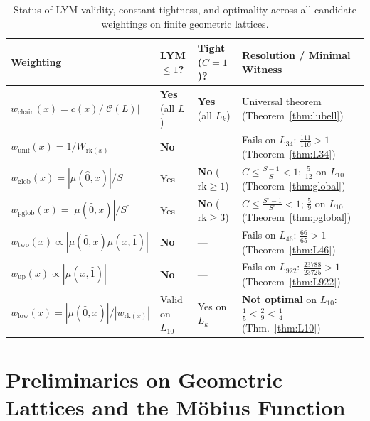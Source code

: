 \documentclass[11pt]{article}
\theoremstyle{definition}
\theoremstyle{remark}
\newcommand{\rk}{\mathrm{rk}}
\begin{document}
\begin{table}[htbp]
\centering
\footnotesize
\setlength{\tabcolsep}{4.5pt}
\renewcommand{\arraystretch}{1.22}
\begin{tabular}{@{}llll@{}}
\toprule
\textbf{Weighting} & \textbf{LYM $\le 1$?} & \textbf{Tight ($C=1$)?} & \textbf{Resolution / Minimal Witness} \\
\midrule
$w_{\mathrm{chain}}(x) = c(x)/|\mathcal{C}(L)|$ & \textbf{Yes} (all $L$) & \textbf{Yes} (all $L_k$) & Universal theorem (Theorem~\ref{thm:lubell}) \\
$w_{\mathrm{unif}}(x) = 1/W_{\rk(x)}$ & \textbf{No} & --- & Fails on $L_{34}$: $\frac{111}{110} > 1$ (Theorem~\ref{thm:L34}) \\
$w_{\mathrm{glob}}(x) = |\mu(\hat{0},x)|/S$ & Yes & \textbf{No} ($\rk \ge 1$) & $C \le \frac{S-1}{S} < 1$; $\frac{5}{12}$ on $L_{10}$ (Theorem~\ref{thm:global}) \\
$w_{\mathrm{pglob}}(x) = |\mu(\hat{0},x)|/S^\circ$ & Yes & \textbf{No} ($\rk \ge 3$) & $C \le \frac{S^\circ-1}{S^\circ} < 1$; $\frac{5}{9}$ on $L_{10}$ (Theorem~\ref{thm:pglobal}) \\
$w_{\mathrm{two}}(x) \propto |\mu(\hat{0},x)\mu(x,\hat{1})|$ & \textbf{No} & --- & Fails on $L_{46}$: $\frac{66}{65} > 1$ (Theorem~\ref{thm:L46}) \\
$w_{\mathrm{up}}(x) \propto |\mu(x,\hat{1})|$ & \textbf{No} & --- & Fails on $L_{922}$: $\frac{23788}{23725} > 1$ (Theorem~\ref{thm:L922}) \\
$w_{\mathrm{low}}(x) = |\mu(\hat{0},x)|/|w_{\rk(x)}|$ & Valid on $L_{10}$ & Yes on $L_k$ & \textbf{Not optimal} on $L_{10}$: $\frac{1}{5} < \frac{2}{9} < \frac{1}{4}$ (Thm.~\ref{thm:L10}) \\
\bottomrule
\end{tabular}
\caption{Status of LYM validity, constant tightness, and optimality across all candidate weightings on finite geometric lattices.}
\label{tab:summary}
\end{table}

\section{Preliminaries on Geometric Lattices and the M\"obius Function}
\end{document}
